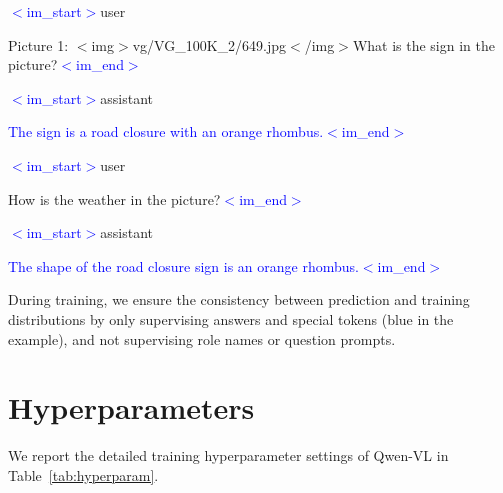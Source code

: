 \documentclass{article}
\begin{document}
\begin{tcolorbox}[colback=black!5!white,colframe=black!75!black,title=The Dataset Format Example of ChatML]
\textcolor{blue}{$<$im\_start$>$}user

Picture 1: $<$img$>$vg/VG\_100K\_2/649.jpg$<$/img$>$What is the sign in the picture?\textcolor{blue}{$<$im\_end$>$}

\textcolor{blue}{$<$im\_start$>$}assistant

\textcolor{blue}{The sign is a road closure with an orange rhombus.$<$im\_end$>$}

\textcolor{blue}{$<$im\_start$>$}user

How is the weather in the picture?\textcolor{blue}{$<$im\_end$>$}

\textcolor{blue}{$<$im\_start$>$}assistant

\textcolor{blue}{The shape of the road closure sign is an orange rhombus.$<$im\_end$>$}
\end{tcolorbox}

During training, we ensure the consistency between prediction and training distributions by only supervising answers and special tokens (blue in the example), and not supervising role names or question prompts.  

\section{Hyperparameters}
\label{app:hyperparam}
We report the detailed training hyperparameter settings of Qwen-VL in Table~\ref{tab:hyperparam}.
\end{document}
